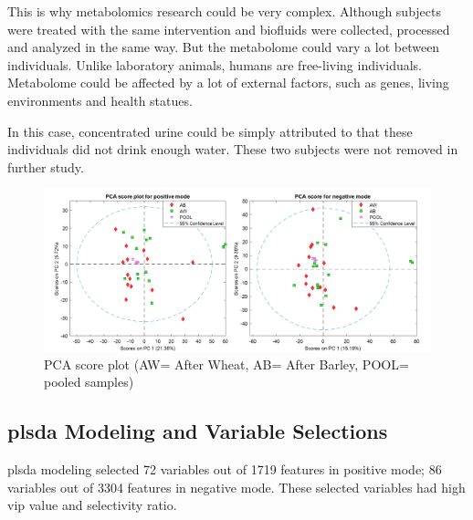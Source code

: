 This is why metabolomics research could be very complex.
Although subjects were treated with the same intervention and biofluids were collected, processed and analyzed in the same way. But the metabolome could vary a lot between individuals.
Unlike laboratory animals, humans are free-living individuals. Metabolome could be affected by a lot of external factors, such as genes, living environments and health statues.

In this case, concentrated urine could be simply attributed to that these individuals did not drink enough water. These two subjects were not removed in further study.
\begin{figure}[h]
    \centering
    \includegraphics[scale=0.43]{images/pca_score.png}
    \caption{PCA score plot (AW= After Wheat, AB= After Barley, POOL= pooled samples)}
    \label{fig:pca}
\end{figure}

\subsection{\acrshort{plsda} Modeling and Variable Selections}
\acrshort{plsda} modeling selected 72 variables out of 1719 features in positive mode; 86 variables out of 3304 features in negative mode.  These selected variables had high \acrshort{vip} value and selectivity ratio.

